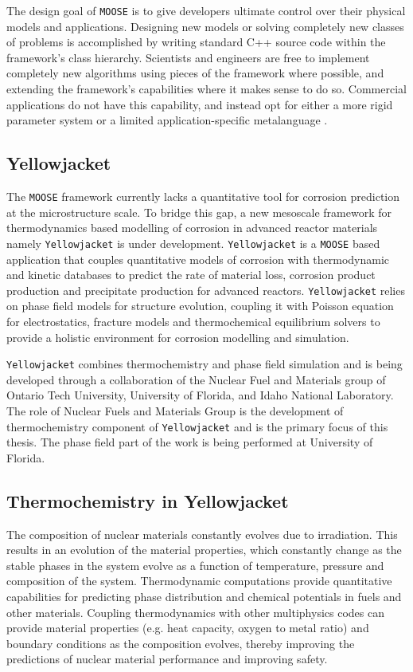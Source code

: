     The design goal of \texttt{MOOSE} is to give developers ultimate control over their physical models and applications. Designing new models or solving completely new classes of problems is accomplished by writing standard C++ source code within the framework's class hierarchy. Scientists and engineers are free to implement completely new algorithms using pieces of the framework where possible, and extending the framework's capabilities where it makes sense to do so. Commercial applications do not have this capability, and instead opt for either a more rigid parameter system or a limited application-specific metalanguage \cite{moose-web-page}.
    
    \subsection*{Yellowjacket}
    The \texttt{MOOSE} framework currently lacks a quantitative tool for corrosion prediction at the microstructure scale. To bridge this gap, a new mesoscale framework for thermodynamics based modelling of corrosion in advanced reactor materials namely \texttt{Yellowjacket} is under development. \texttt{Yellowjacket} is a \texttt{MOOSE} based application that couples quantitative models of corrosion with thermodynamic and kinetic databases to predict the rate of material loss, corrosion product production and precipitate production for advanced reactors. \texttt{Yellowjacket} relies on phase field models for structure evolution, coupling it with Poisson equation for electrostatics, fracture models and thermochemical equilibrium solvers to provide a holistic  environment for corrosion modelling and simulation.
    
    \texttt{Yellowjacket} combines thermochemistry and phase field simulation and is being developed through a collaboration of the Nuclear Fuel and Materials group of Ontario Tech University,  University of Florida, and Idaho National Laboratory. The role of Nuclear Fuels and Materials Group is the development of thermochemistry component of \texttt{Yellowjacket} and is the primary focus of this thesis. The phase field part of the work is being performed at University of Florida.
        
    \subsection*{Thermochemistry in Yellowjacket}
    The composition of nuclear materials constantly evolves due to irradiation. This results in an evolution of the material properties, which constantly change as the stable phases in the system evolve as a function of temperature, pressure and composition of the system. Thermodynamic computations provide quantitative capabilities for predicting phase distribution and chemical potentials in fuels and other materials. Coupling thermodynamics with other multiphysics codes can provide material properties (e.g. heat capacity, oxygen to metal ratio) and boundary conditions as the composition evolves, thereby improving the predictions of nuclear material performance and improving safety.
    
